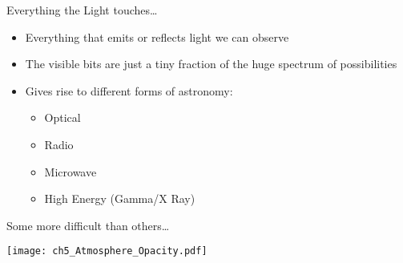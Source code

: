 \documentclass[pdf,xcolor={rgb},aspectratio=169]{beamer}
\begin{document}
\begin{frame}{Everything the Light touches\ldots}
  \begin{itemize}
	\item Everything that emits or reflects light we can observe
	\item The visible bits are just a tiny fraction of the huge spectrum of possibilities
	\item Gives rise to different forms of astronomy:
	  \begin{itemize}
		\item Optical
		\item Radio
		\item Microwave
		\item High Energy (Gamma/X Ray)
	  \end{itemize}
  \end{itemize}
\end{frame}

\begin{frame}{Some more difficult than others\ldots}
  \begin{center}
	\texttt{[image: ch5\_Atmosphere\_Opacity.pdf]}
  \end{center}
\end{frame}

\end{document}
